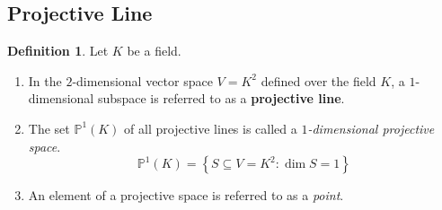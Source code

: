 \documentclass[12pt,openany]{book}
\theoremstyle{definition}
\newtheorem{definition}{Definition}[chapter]
\newcommand{\set}[1]{\left\{#1\right\}}
\begin{document}
	\subsection{Projective Line}
	
	\begin{tcolorbox}[colback=white,colframe=defcolor,arc=5pt,title={\color{white}\bf Projective Line}]
		\begin{definition}
			Let $K$ be a field. \begin{enumerate}[(1)]
				\item In the $2$-dimensional vector space $V=K^2$ defined over the field $K$, a $1$-dimensional subspace is referred to as a \textbf{projective line}.
				\item The set $\mathbb{P}^1(K)$ of all projective lines is called a \textit{$1$-dimensional projective space}. \[
				\mathbb{P}^1(K)=\set{S\subseteq V=K^2:\dim{S}=1}
				\]
				\item An element of a projective space is referred to as a \textit{point}.
			\end{enumerate}
		\end{definition}
	\end{tcolorbox}
	
\end{document}
